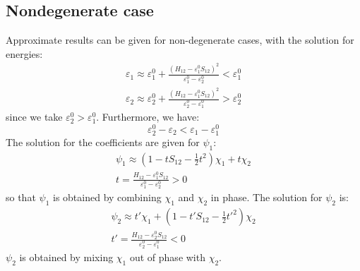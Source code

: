 \documentclass{article}
\begin{document}
\subsection{Nondegenerate case}
Approximate results can be given for non-degenerate cases, with the solution for energies:
\begin{align}
    \varepsilon_1 \approx \varepsilon_1^0 + \frac{(H_{12} - \varepsilon_1^0 S_{12})^2}{\varepsilon_1^0 - \varepsilon_2^0} < \varepsilon_1^0 \\
    \varepsilon_2 \approx \varepsilon_2^0 + \frac{(H_{12} - \varepsilon_1^0 S_{12})^2}{\varepsilon_2^0 - \varepsilon_1^0} > \varepsilon_2^0
\end{align}
since we take $\varepsilon_2^0 > \varepsilon_1^0$. Furthermore, we have:
\begin{equation}
    \varepsilon_2^0 - \varepsilon_2 < \varepsilon_1 - \varepsilon_1^0
\end{equation}
The solution for the coefficients are given for $\psi_1$:
\begin{gather}
    \psi_1 \approx \left(1 - tS_{12} - \frac{1}{2}t^2\right) \chi_1 + t \chi_2 \\
    t = \frac{H_{12}-\varepsilon_1^0S_{12}}{\varepsilon_1^0 - \varepsilon_2^0} > 0
\end{gather}
so that $\psi_1$ is obtained by combining $\chi_1$ and $\chi_2$ in phase. 
The solution for $\psi_2$ is:
\begin{gather}
    \psi_2 \approx t' \chi_1 + \left( 1 - t' S_{12} - \frac{1}{2}t'^2 \right) \chi_2 \\
    t' = \frac{H_{12}-\varepsilon_2^0S_{12}}{\varepsilon_2^0 - \varepsilon_1^0} < 0
\end{gather}
$\psi_2$ is obtained by mixing $\chi_1$ out of phase with $\chi_2$. 
\end{document}
